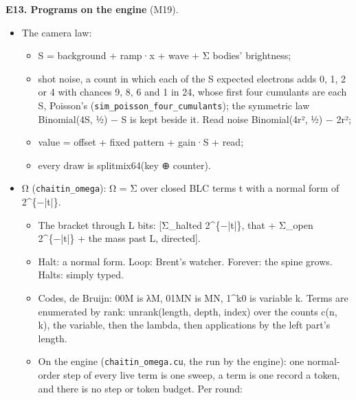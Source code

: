 \textbf{E13. Programs on the engine} (M19).

\begin{itemize}
\item The camera law:

\begin{itemize}
\item S = background + ramp·x + wave + Σ bodies' brightness;
\item shot noise, a count in which each of the S expected electrons adds 0, 1, 2 or 4 with chances 9, 8, 6 and 1 in 24, whose first four cumulants are each S, Poisson's (\texttt{sim\_\allowbreak{}poisson\_\allowbreak{}four\_\allowbreak{}cumulants}); the symmetric law Binomial(4S, ½) − S is kept beside it. Read noise Binomial(4r², ½) − 2r²;
\item value = offset + fixed pattern + gain·S + read;
\item every draw is splitmix64(key ⊕ counter).
\end{itemize}
\item Ω (\texttt{chaitin\_\allowbreak{}omega}): Ω = Σ over closed BLC terms t with a normal form of 2\textasciicircum{}\{−|t|\}.

\begin{itemize}
\item The bracket through L bits: [Σ\_\allowbreak{}halted 2\textasciicircum{}\{−|t|\}, that + Σ\_\allowbreak{}open 2\textasciicircum{}\{−|t|\} + the mass past L, directed].
\item Halt: a normal form. Loop: Brent's watcher. Forever: the spine grows. Halts: simply typed.
\item Codes, de Bruijn: 00M is λM, 01MN is MN, 1\textasciicircum{}k0 is variable k. Terms are enumerated by rank: unrank(length, depth, index) over the counts c(n, k), the variable, then the lambda, then applications by the left part's length.
\item On the engine (\texttt{chaitin\_\allowbreak{}omega.\allowbreak{}cu}, the run by the engine): one normal-order step of every live term is one sweep, a term is one record a token, and there is no step or token budget. Per round:


\end{itemize}
\end{itemize}
